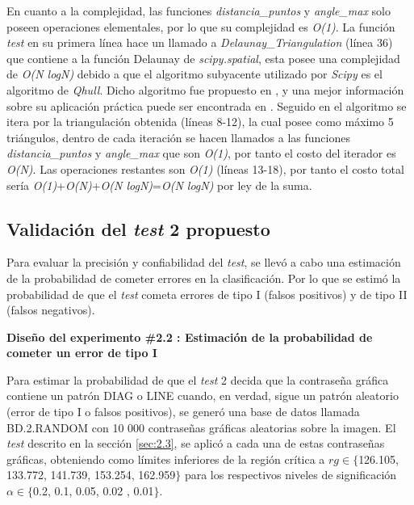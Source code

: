 \documentclass[12pt]{report}
\begin{document}
En cuanto a la complejidad, las funciones \textit{distancia\_puntos} y \textit{angle\_max} solo poseen operaciones elementales, por lo que su complejidad es \textit{O(1)}. La función\textit{ test} en su primera línea hace un llamado a  \textit{Delaunay\_Triangulation} (línea 36) que  contiene a la función Delaunay de \textit{scipy.spatial}, esta posee una complejidad de \textit{O(N logN)} debido a que el algoritmo subyacente utilizado por \textit{Scipy} es el algoritmo de \textit{Qhull}. Dicho algoritmo fue propuesto en \cite{31}, y una mejor información sobre su aplicación práctica puede ser encontrada en \cite{32}. Seguido en el algoritmo se itera por la triangulación obtenida (líneas 8-12), la cual posee como máximo 5 triángulos, dentro de cada iteración se hacen llamados a las  funciones \textit{distancia\_puntos} y \textit{angle\_max}  que son \textit{O(1)}, por tanto el costo del iterador es \textit{O(N)}. Las operaciones restantes son \textit{O(1)} (líneas 13-18), por tanto el costo total sería \textit{O(1)}+\textit{O(N)}+\textit{O(N logN)}=\textit{O(N logN)} por ley de la suma.

\subsection{Validación del \textit{test} 2 propuesto}
\label{sec:2.4}

Para evaluar la precisión y confiabilidad del \textit{test}, se llevó a cabo una estimación de la probabilidad de cometer errores en la clasificación. Por lo que se estimó la probabilidad de que el \textit{test} cometa  errores de tipo I (falsos positivos) y de tipo II (falsos negativos).

\textbf{Diseño del experimento \#2.2 : Estimación de la probabilidad de cometer un error de tipo I} 

Para estimar la probabilidad de que el \textit{test} 2 decida que la contraseña gráfica contiene un patrón DIAG o LINE cuando, en verdad, sigue un patrón aleatorio (error de tipo I o falsos positivos), se generó una base de datos llamada BD.2.RANDOM con 10 000 contraseñas gráficas aleatorias sobre la imagen. El \textit{test} descrito en la sección \ref{sec:2.3}, se aplicó a cada una de estas contraseñas gráficas, obteniendo como límites inferiores de la región crítica a  $rg \in \{$126.105, 133.772, 141.739, 153.254, 162.959$\}$ para los respectivos  niveles de significación $\alpha \in \{$0.2, 0.1, 0.05, 0.02 , 0.01$\}$.
\end{document}
